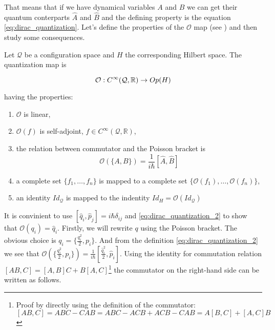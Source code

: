 That means that if we have dynamical variables $A$ and $B$ we can get their quantum conterparts $\hat{A}$ and $\hat{B}$ and the
defining property is the equation \ref{eq:dirac_quantization}. Let's define the properties of the $\mathcal{O}$ map (see \cite{floarin_jung})
and then study some consequences.

\begin{definition}
    \label{df:o_map}

    Let $\mathcal{Q}$ be a configuration space and $H$ the corresponding Hilbert space. The quantization map is

    \begin{equation}
        \mathcal{O}: C^{\infty}(\mathcal{Q}, \mathbb{R}) \to Op(H) \\
    \end{equation}
    
    having the properties:

    \begin{enumerate}
        \item $\mathcal{O}$ is linear,
        \item $\mathcal{O}(f)$ is self-adjoint, $f \in C^{\infty}(\mathcal{Q}, \mathbb{R})$,
        \item the relation between commutator and the Poisson bracket is
            \begin{equation}
                \label{eq:dirac_quantization_2}
                \mathcal{O}(\{A, B\}) = \frac{1}{i \hbar} [\hat{A}, \hat{B}]
            \end{equation}
        \item a complete set $\{f_{1}, \dots, f_{n}\}$ is mapped to a complete set $\{\mathcal{O}(f_{1}), \dots, \mathcal{O}(f_{n})\}$,
        \item an identity $Id_{\mathcal{Q}}$ is mapped to the indentity $Id_{H} = \mathcal{O}(Id_{\mathcal{Q}})$
    \end{enumerate}
\end{definition}

It is convinient to use $[\hat{q}_{i}, \hat{p}_{j}] = i \hbar \delta_{ij}$ and \ref{eq:dirac_quantization_2} to show
that $\mathcal{O}(q_{i}) = \hat{q}_{i}$. Firstly, we will rewrite $q$ using the Poisson bracket. The obvious choice is $q_{i} = \{\frac{q_{i}^{2}}{2}, p_{i}\}$.
And from the definition \ref{eq:dirac_quantization_2} we see that $\mathcal{O}(\{\frac{q_{i}^{2}}{2}, p_{i}\}) = \frac{1}{i \hbar}[\frac{\hat{q}_{i}^{2}}{2}, \hat{p}_{i}]$.
Using the identity for commutation relation $[AB, C] = [A, B]C + B[A, C]$\footnote{Proof by directly using the definition of 
the commutator: $[AB, C] = ABC - CAB = ABC - ACB + ACB - CAB = A [B, C] + [A, C] B$} the commutator on the right-hand side can
be written as follows.


